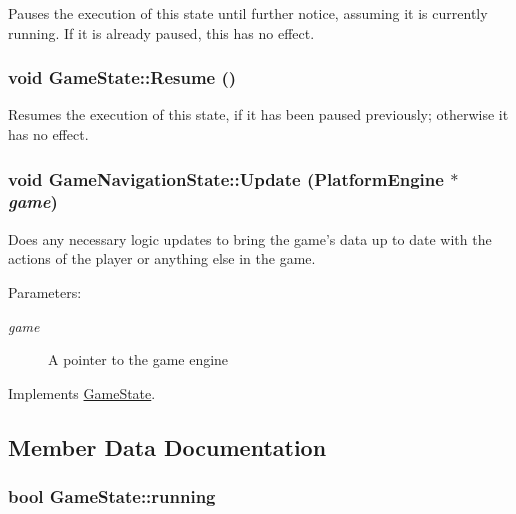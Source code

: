 Pauses the execution of this state until further notice, assuming it is currently running. If it is already paused, this has no effect. \hypertarget{class_game_state_d12ece3c3fb066281b73b07a315f04e8}{
\subsubsection[{Resume}]{\setlength{\rightskip}{0pt plus 5cm}void GameState::Resume ()}}
\label{dd/d87/class_game_state_d12ece3c3fb066281b73b07a315f04e8}


Resumes the execution of this state, if it has been paused previously; otherwise it has no effect. \hypertarget{class_game_navigation_state_90f5e6d6287a875d8f2737180f46a004}{
\subsubsection[{Update}]{\setlength{\rightskip}{0pt plus 5cm}void GameNavigationState::Update ({\bf PlatformEngine} $\ast$ {\em game})}}
\label{de/d2a/class_game_navigation_state_90f5e6d6287a875d8f2737180f46a004}


Does any necessary logic updates to bring the game's data up to date with the actions of the player or anything else in the game.

\begin{Desc}
\item[Parameters:]
\begin{description}
\item[{\em game}]A pointer to the game engine \end{description}
\end{Desc}


Implements \hyperlink{class_game_state_100ca49bc95afce1d5c5b756708bbc2b}{GameState}.

\subsection{Member Data Documentation}
\hypertarget{class_game_state_391df04a740c7480270d3c71a578b43a}{
\subsubsection[{running}]{\setlength{\rightskip}{0pt plus 5cm}bool {\bf GameState::running}}}
\label{dd/d87/class_game_state_391df04a740c7480270d3c71a578b43a}


